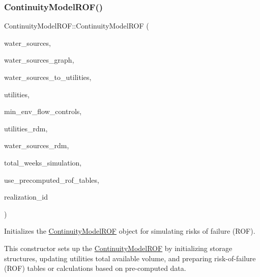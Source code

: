 \subsubsection{\texorpdfstring{Continuity\+Model\+R\+O\+F()}{ContinuityModelROF()}}
{\footnotesize\ttfamily Continuity\+Model\+R\+O\+F\+::\+Continuity\+Model\+R\+OF (\begin{DoxyParamCaption}\item[{vector$<$ \mbox{\hyperlink{classWaterSource}{Water\+Source}} $\ast$$>$}]{water\+\_\+sources,  }\item[{const Graph \&}]{water\+\_\+sources\+\_\+graph,  }\item[{const vector$<$ vector$<$ int $>$$>$ \&}]{water\+\_\+sources\+\_\+to\+\_\+utilities,  }\item[{vector$<$ \mbox{\hyperlink{classUtility}{Utility}} $\ast$$>$}]{utilities,  }\item[{vector$<$ Min\+Env\+Flow\+Control $\ast$$>$}]{min\+\_\+env\+\_\+flow\+\_\+controls,  }\item[{vector$<$ double $>$ \&}]{utilities\+\_\+rdm,  }\item[{vector$<$ double $>$ \&}]{water\+\_\+sources\+\_\+rdm,  }\item[{unsigned long}]{total\+\_\+weeks\+\_\+simulation,  }\item[{const int}]{use\+\_\+precomputed\+\_\+rof\+\_\+tables,  }\item[{const unsigned long}]{realization\+\_\+id }\end{DoxyParamCaption})}



Initializes the \mbox{\hyperlink{classContinuityModelROF}{Continuity\+Model\+R\+OF}} object for simulating risks of failure (R\+OF). 

This constructor sets up the \mbox{\hyperlink{classContinuityModelROF}{Continuity\+Model\+R\+OF}} by initializing storage structures, updating utilities\textquotesingle{} total available volume, and preparing risk-\/of-\/failure (R\+OF) tables or calculations based on pre-\/computed data.


